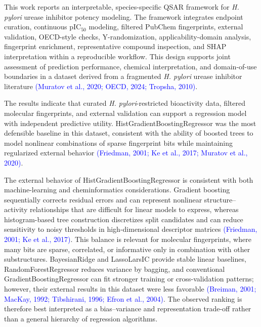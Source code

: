 \documentclass[11pt]{article}
\begin{document}
This work reports an interpretable, species-specific QSAR framework for \textit{H. pylori} urease inhibitor potency modeling. The framework integrates endpoint curation, continuous pIC$_{50}$ modeling, filtered PubChem fingerprints, external validation, OECD-style checks, Y-randomization, applicability-domain analysis, fingerprint enrichment, representative compound inspection, and SHAP interpretation within a reproducible workflow. This design supports joint assessment of prediction performance, chemical interpretation, and domain-of-use boundaries in a dataset derived from a fragmented \textit{H. pylori} urease inhibitor literature \textcolor{blue}{(Muratov et al., 2020; OECD, 2024; Tropsha, 2010)}.

The results indicate that curated \textit{H. pylori}-restricted bioactivity data, filtered molecular fingerprints, and external validation can support a regression model with independent predictive utility. HistGradientBoostingRegressor was the most defensible baseline in this dataset, consistent with the ability of boosted trees to model nonlinear combinations of sparse fingerprint bits while maintaining regularized external behavior \textcolor{blue}{(Friedman, 2001; Ke et al., 2017; Muratov et al., 2020)}.

The external behavior of HistGradientBoostingRegressor is consistent with both machine-learning and cheminformatics considerations. Gradient boosting sequentially corrects residual errors and can represent nonlinear structure--activity relationships that are difficult for linear models to express, whereas histogram-based tree construction discretizes split candidates and can reduce sensitivity to noisy thresholds in high-dimensional descriptor matrices \textcolor{blue}{(Friedman, 2001; Ke et al., 2017)}. This balance is relevant for molecular fingerprints, where many bits are sparse, correlated, or informative only in combination with other substructures. BayesianRidge and LassoLarsIC provide stable linear baselines, RandomForestRegressor reduces variance by bagging, and conventional GradientBoostingRegressor can fit stronger training or cross-validation patterns; however, their external results in this dataset were less favorable \textcolor{blue}{(Breiman, 2001; MacKay, 1992; Tibshirani, 1996; Efron et al., 2004)}. The observed ranking is therefore best interpreted as a bias--variance and representation trade-off rather than a general hierarchy of regression algorithms.
\end{document}
